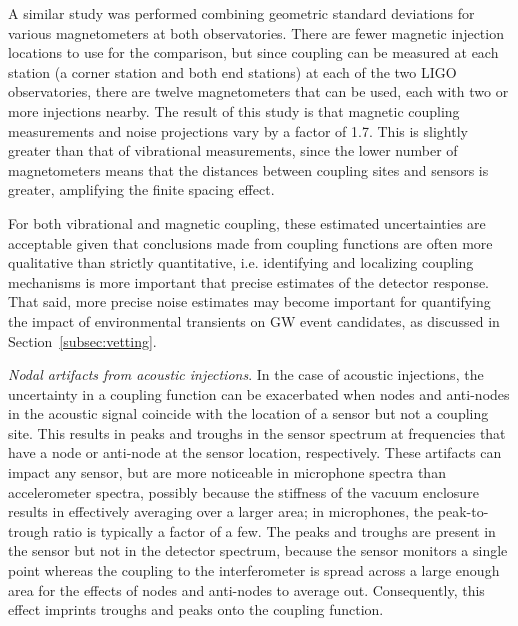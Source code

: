 A similar study was performed combining geometric standard deviations for various magnetometers at both observatories.
There are fewer magnetic injection locations to use for the comparison, but since coupling can be measured at each station (a corner station and both end stations) at each of the two LIGO observatories, there are twelve magnetometers that can be used, each with two or more injections nearby.
The result of this study is that magnetic coupling measurements and noise projections vary by a factor of 1.7.%
This is slightly greater than that of vibrational measurements, since the lower number of magnetometers means that the distances between coupling sites and sensors is greater, amplifying the finite spacing effect.

For both vibrational and magnetic coupling, these estimated uncertainties are acceptable given that conclusions made from coupling functions are often more qualitative than strictly quantitative, i.e. identifying and localizing coupling mechanisms is more important that precise estimates of the detector response.
That said, more precise noise estimates may become important for quantifying the impact of environmental transients on \ac{GW} event candidates, as discussed in Section~\ref{subsec:vetting}.

\textit{Nodal artifacts from acoustic injections}.
In the case of acoustic injections, the uncertainty in a coupling function can be exacerbated when nodes and anti-nodes in the acoustic signal coincide with the location of a sensor but not a coupling site.
This results in peaks and troughs in the sensor spectrum at frequencies that have a node or anti-node at the sensor location, respectively.
These artifacts can impact any sensor, but are more noticeable in microphone spectra than accelerometer spectra, possibly because the stiffness of the vacuum enclosure results in effectively averaging over a larger area; in microphones, the peak-to-trough ratio is typically a factor of a few.
The peaks and troughs are present in the sensor but not in the detector spectrum, because the sensor monitors a single point whereas the coupling to the interferometer is spread across a large enough area for the effects of nodes and anti-nodes to average out.
Consequently, this effect imprints troughs and peaks onto the coupling function.

